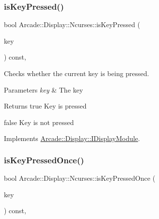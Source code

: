 \mbox{\label{classArcade_1_1Display_1_1Ncurses_a10f2b5576e60581c43719ab2ea882d93}} 
\subsubsection{\texorpdfstring{isKeyPressed()}{isKeyPressed()}}
{\footnotesize\ttfamily bool Arcade\+::\+Display\+::\+Ncurses\+::is\+Key\+Pressed (\begin{DoxyParamCaption}\item[{\mbox{\hyperlink{classArcade_1_1Display_1_1IDisplayModule_a8da3f6b309ca0581473ae8cc8789b619}{I\+Display\+Module\+::\+Keys}}}]{key }\end{DoxyParamCaption}) const\hspace{0.3cm}{\ttfamily [final]}, {\ttfamily [virtual]}}



Checks whether the current key is being pressed. 


\begin{DoxyParams}{Parameters}
{\em key} & The key \\
\hline
\end{DoxyParams}
\begin{DoxyReturn}{Returns}
true Key is pressed 

false Key is not pressed 
\end{DoxyReturn}


Implements \mbox{\hyperlink{classArcade_1_1Display_1_1IDisplayModule_af871661ff84c21581cd7233ba6f27aa0}{Arcade\+::\+Display\+::\+I\+Display\+Module}}.

\mbox{\label{classArcade_1_1Display_1_1Ncurses_ae32ffc3c3923c09809c6d13822606af1}} 
\subsubsection{\texorpdfstring{isKeyPressedOnce()}{isKeyPressedOnce()}}
{\footnotesize\ttfamily bool Arcade\+::\+Display\+::\+Ncurses\+::is\+Key\+Pressed\+Once (\begin{DoxyParamCaption}\item[{\mbox{\hyperlink{classArcade_1_1Display_1_1IDisplayModule_a8da3f6b309ca0581473ae8cc8789b619}{I\+Display\+Module\+::\+Keys}}}]{key }\end{DoxyParamCaption}) const\hspace{0.3cm}{\ttfamily [final]}, {\ttfamily [virtual]}}




